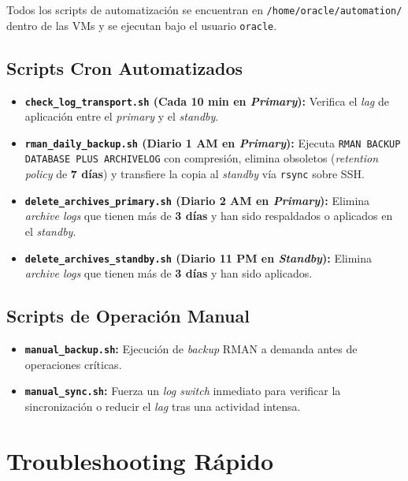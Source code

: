 \documentclass[11pt, a4paper]{report}
\begin{document}
Todos los scripts de automatización se encuentran en \texttt{/home/oracle/automation/} dentro de las VMs y se ejecutan bajo el usuario \texttt{oracle}.
\subsection{Scripts Cron Automatizados}

\begin{itemize}
    \item \textbf{\texttt{check\_log\_transport.sh} (Cada 10 min en \textit{Primary}):} Verifica el \textit{lag} de aplicación entre el \textit{primary} y el \textit{standby}.
\item \textbf{\texttt{rman\_daily\_backup.sh} (Diario 1 AM en \textit{Primary}):} Ejecuta \texttt{RMAN BACKUP DATABASE PLUS ARCHIVELOG} con compresión, elimina obsoletos (\textit{retention policy} de \textbf{7 días}) y transfiere la copia al \textit{standby} vía \texttt{rsync} sobre SSH.
\item \textbf{\texttt{delete\_archives\_primary.sh} (Diario 2 AM en \textit{Primary}):} Elimina \textit{archive logs} que tienen más de \textbf{3 días} y han sido respaldados o aplicados en el \textit{standby}.
\item \textbf{\texttt{delete\_archives\_standby.sh} (Diario 11 PM en \textit{Standby}):} Elimina \textit{archive logs} que tienen más de \textbf{3 días} y han sido aplicados.
\end{itemize}

\subsection{Scripts de Operación Manual}

\begin{itemize}
    \item \textbf{\texttt{manual\_backup.sh}:} Ejecución de \textit{backup} RMAN a demanda antes de operaciones críticas.
    \item \textbf{\texttt{manual\_sync.sh}:} Fuerza un \textit{log switch} inmediato para verificar la sincronización o reducir el \textit{lag} tras una actividad intensa.
\end{itemize}

\section{Troubleshooting Rápido}
\end{document}
